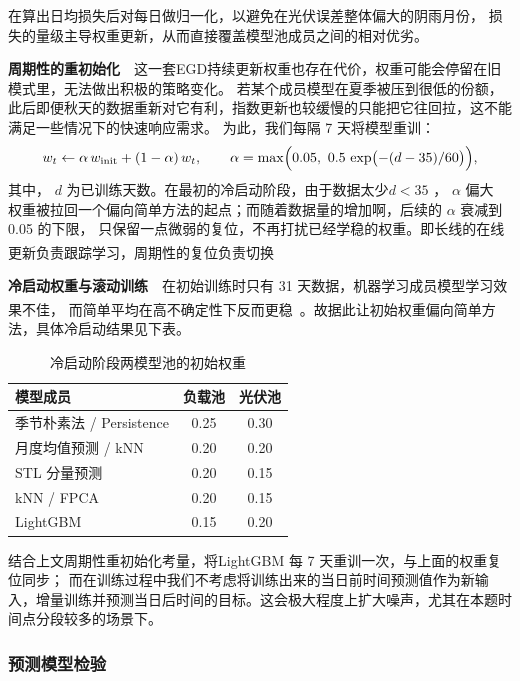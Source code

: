 \documentclass[zihao=-4,a4paper,fontset=none]{ctexart}
\newcommand{\upcite}[1]{\textsuperscript{\cite{#1}}}
\begin{document}
在算出日均损失后对每日做归一化，以避免在光伏误差整体偏大的阴雨月份，
损失的量级主导权重更新，从而直接覆盖模型池成员之间的相对优劣。

\textbf{周期性的重初始化}\ \ 这一套EGD持续更新权重也存在代价，权重可能会停留在旧模式里，无法做出积极的策略变化。
若某个成员模型在夏季被压到很低的份额，此后即便秋天的数据重新对它有利，指数更新也较缓慢的只能把它往回拉，这不能满足一些情况下的快速响应需求。
为此，我们每隔 7 天将模型重训：
\begin{equation}
w_t\leftarrow \alpha\,w_{\mathrm{init}}+(1-\alpha)\,w_t,\qquad \alpha=\max\Bigl(0.05,\ 0.5\,\exp\bigl(-(d-35)/60\bigr)\Bigr),
\label{eq:reinit}
\end{equation}
其中， $d$ 为已训练天数。在最初的冷启动阶段，由于数据太少$d<35$ ， $\alpha$ 偏大
权重被拉回一个偏向简单方法的起点；而随着数据量的增加啊，后续的 $\alpha$ 衰减到 0.05 的下限，
只保留一点微弱的复位，不再打扰已经学稳的权重。即长线的在线更新负责跟踪学习，周期性的复位负责切换\upcite{zhang2023onenet}

\textbf{冷启动权重与滚动训练}\ \ 在初始训练时只有 31 天数据，机器学习成员模型学习效果不佳，
而简单平均在高不确定性下反而更稳~\upcite{graefe2015}。故据此让初始权重偏向简单方法，具体冷启动结果见下表。

\begin{table}[htbp]
\centering
\caption{冷启动阶段两模型池的初始权重}
{\small
\begin{tabular}{lcc}
\toprule
模型成员 & 负载池 & 光伏池 \\
\midrule
季节朴素法 / Persistence & 0.25 & 0.30 \\
月度均值预测 / kNN       & 0.20 & 0.20 \\
STL 分量预测             & 0.20 & 0.15 \\
kNN / FPCA               & 0.20 & 0.15 \\
LightGBM                 & 0.15 & 0.20 \\
\bottomrule
\end{tabular}}
\label{tab:coldstart}
\end{table}

结合上文周期性重初始化考量，将LightGBM 每 7 天重训一次，与上面的权重复位同步；
而在训练过程中我们不考虑将训练出来的当日前时间预测值作为新输入，增量训练并预测当日后时间的目标。这会极大程度上扩大噪声，尤其在本题时间点分段较多的场景下。
\subsubsection{预测模型检验}
\label{sub:p2fsolve}
\end{document}
